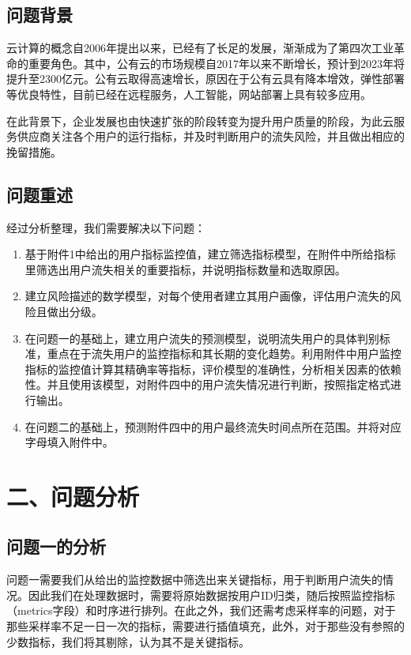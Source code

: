 \documentclass{my_paper}
\begin{document}
\subsection{问题背景}

云计算的概念自2006年提出以来，已经有了长足的发展，渐渐成为了第四次工业革命的重要角色。其中，公有云的市场规模自2017年以来不断增长，预计到2023年将提升至2300亿元。\cite{1}公有云取得高速增长，原因在于公有云具有降本增效，弹性部署等优良特性，目前已经在远程服务，人工智能，网站部署上具有较多应用。

在此背景下，企业发展也由快速扩张的阶段转变为提升用户质量的阶段，为此云服务供应商关注各个用户的运行指标，并及时判断用户的流失风险，并且做出相应的挽留措施。

\subsection{问题重述}
经过分析整理，我们需要解决以下问题：
\begin{enumerate}
    \item 基于附件1中给出的用户指标监控值，建立筛选指标模型，在附件中所给指标里筛选出用户流失相关的重要指标，并说明指标数量和选取原因。
    \item 建立风险描述的数学模型，对每个使用者建立其用户画像，评估用户流失的风险且做出分级。
    \item 在问题一的基础上，建立用户流失的预测模型，说明流失用户的具体判别标准，重点在于流失用户的监控指标和其长期的变化趋势。利用附件中用户监控指标的监控值计算其精确率等指标，评价模型的准确性，分析相关因素的依赖性。并且使用该模型，对附件四中的用户流失情况进行判断，按照指定格式进行输出。
    \item 在问题二的基础上，预测附件四中的用户最终流失时间点所在范围。并将对应字母填入附件中。
\end{enumerate}

\section{二、问题分析}
\subsection{问题一的分析}

问题一需要我们从给出的监控数据中筛选出来关键指标，用于判断用户流失的情况。因此我们在处理数据时，需要将原始数据按用户ID归类，随后按照监控指标（metrics字段）和时序进行排列。在此之外，我们还需考虑采样率的问题，对于那些采样率不足一日一次的指标，需要进行插值填充，此外，对于那些没有参照的少数指标，我们将其剔除，认为其不是关键指标。
\end{document}

